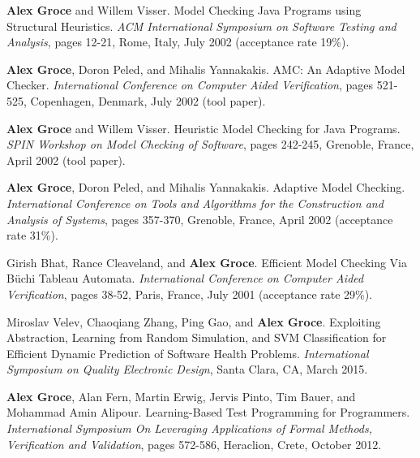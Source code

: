 \documentclass[ComputerScience]{vita}
\begin{document}
\begin{vita}
\begin{Refereed Conference and Workshop Publications}
\item
{\bf Alex Groce} and Willem Visser.
\newblock Model Checking Java Programs using Structural Heuristics.
\newblock \emph{ACM International Symposium on Software Testing and Analysis}, pages 12-21, Rome, Italy, July 2002 (acceptance rate 19\%).

\item
{\bf Alex Groce}, Doron Peled, and Mihalis Yannakakis.
\newblock AMC: An Adaptive Model Checker.
\newblock \emph{International Conference on Computer Aided Verification}, pages 521-525, Copenhagen, Denmark, July 2002 (tool paper).

\item
{\bf Alex Groce} and Willem Visser.
\newblock Heuristic Model Checking for Java Programs.
\newblock \emph{SPIN Workshop on Model Checking of Software}, pages 242-245, Grenoble, France, April 2002 (tool paper).

\item
{\bf Alex Groce}, Doron Peled, and Mihalis Yannakakis.
\newblock Adaptive Model Checking.
\newblock \emph{International Conference on Tools and Algorithms for the Construction and Analysis of Systems}, pages 357-370, Grenoble, France, April 2002 (acceptance rate 31\%).

\item
Girish Bhat, Rance Cleaveland, and {\bf Alex Groce}.
\newblock Efficient Model Checking Via B\"uchi Tableau Automata.
\newblock \emph{International Conference on Computer Aided Verification}, pages 38-52, Paris, France, July 2001 (acceptance rate 29\%).
\end{Refereed Conference and Workshop Publications}















\begin{Invited Papers}
\item Miroslav Velev, Chaoqiang Zhang, Ping Gao, and {\bf Alex Groce}.
\newblock Exploiting Abstraction, Learning from Random Simulation, and SVM Classification for Efficient Dynamic Prediction of Software Health Problems.
\newblock \emph{International Symposium on Quality Electronic Design}, Santa Clara, CA, March 2015.

\item {\bf Alex Groce}, Alan Fern, Martin Erwig, Jervis Pinto, Tim Bauer, and Mohammad Amin Alipour.
\newblock Learning-Based Test Programming for Programmers.
\newblock \emph{International Symposium On Leveraging Applications of Formal Methods, Verification and Validation}, pages 572-586, Heraclion, Crete, October 2012.



\end{Invited Papers}
\end{vita}
\end{document}

